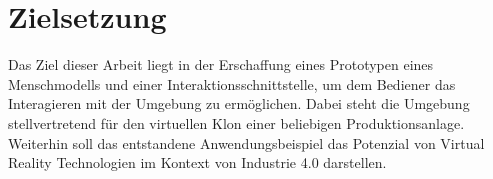 \section{Zielsetzung}\label{sec:Zielsetzung}
Das Ziel dieser Arbeit liegt in der Erschaffung eines Prototypen eines Menschmodells und einer Interaktionsschnittstelle, um dem Bediener das Interagieren mit der Umgebung zu ermöglichen. Dabei steht die Umgebung stellvertretend für den virtuellen Klon einer beliebigen Produktionsanlage. Weiterhin soll das entstandene Anwendungsbeispiel das Potenzial von Virtual Reality Technologien im Kontext von Industrie 4.0 darstellen.
\newpage

